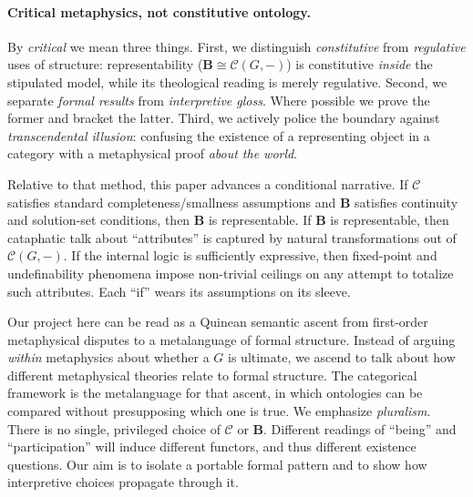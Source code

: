 \documentclass[11pt]{article}
\theoremstyle{upright}
\begin{document}
\paragraph{Critical metaphysics, not constitutive ontology.}
By \emph{critical} we mean three things. First, we distinguish \emph{constitutive} from \emph{regulative} uses of structure: representability (\(\mathbf B\cong\mathcal C(G,-)\)) is constitutive \emph{inside} the stipulated model, while its theological reading is merely regulative. Second, we separate \emph{formal results} from \emph{interpretive gloss}. Where possible we prove the former and bracket the latter. Third, we actively police the boundary against \emph{transcendental illusion}: confusing the existence of a representing object in a category with a metaphysical proof \emph{about the world}.

Relative to that method, this paper advances a conditional narrative. If \(\mathcal C\) satisfies standard completeness/smallness assumptions and \(\mathbf B\) satisfies continuity and solution-set conditions, then \(\mathbf B\) is representable. If \(\mathbf B\) is representable, then cataphatic talk about “attributes” is captured by natural transformations out of \(\mathcal C(G,-)\). If the internal logic is sufficiently expressive, then fixed-point and undefinability phenomena impose non-trivial ceilings on any attempt to totalize such attributes. Each “if” wears its assumptions on its sleeve.

Our project here can be read as a Quinean semantic ascent \citep{Quine1960} from first-order metaphysical disputes to a metalanguage of formal structure. Instead of arguing \emph{within} metaphysics about whether a \(G\) is ultimate, we ascend to talk about how different metaphysical theories relate to formal structure. The categorical framework is the metalanguage for that ascent, in which ontologies can be compared without presupposing which one is true. We emphasize \emph{pluralism}. There is no single, privileged choice of \(\mathcal C\) or \(\mathbf B\). Different readings of “being” and “participation” will induce different functors, and thus different existence questions. Our aim is to isolate a portable formal pattern and to show how interpretive choices propagate through it.
\end{document}
